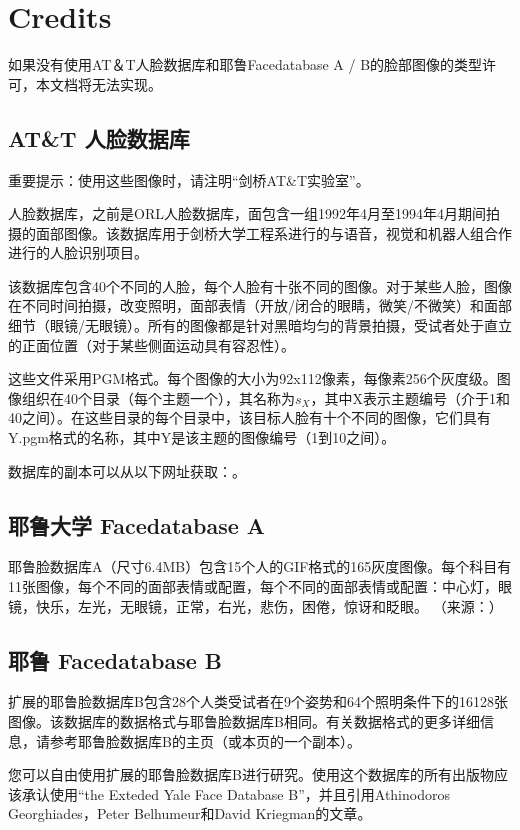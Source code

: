 \documentclass[UTF8]{ctexart}
\begin{document}
\section{Credits}
如果没有使用AT＆T人脸数据库和耶鲁Facedatabase A / B的脸部图像的类型许可，本文档将无法实现。

\subsection{AT\&T 人脸数据库}
重要提示：使用这些图像时，请注明“剑桥AT\&T实验室”。

人脸数据库，之前是ORL人脸数据库，面包含一组1992年4月至1994年4月期间拍摄的面部图像。该数据库用于剑桥大学工程系进行的与语音，视觉和机器人组合作进行的人脸识别项目。

该数据库包含40个不同的人脸，每个人脸有十张不同的图像。对于某些人脸，图像在不同时间拍摄，改变照明，面部表情（开放/闭合的眼睛，微笑/不微笑）和面部细节（眼镜/无眼镜）。所有的图像都是针对黑暗均匀的背景拍摄，受试者处于直立的正面位置（对于某些侧面运动具有容忍性）。

这些文件采用PGM格式。每个图像的大小为92x112像素，每像素256个灰度级。图像组织在40个目录（每个主题一个），其名称为$s_X$，其中X表示主题编号（介于1和40之间）。在这些目录的每个目录中，该目标人脸有十个不同的图像，它们具有Y.pgm格式的名称，其中Y是该主题的图像编号（1到10之间）。

数据库的副本可以从以下网址获取：{\color{blue}{http://www.cl.cam.ac.uk/research/dtg/attarchive/pub/data/att\_faces.zip}}。

\subsection{耶鲁大学 Facedatabase A}
耶鲁脸数据库A（尺寸6.4MB）包含15个人的GIF格式的165灰度图像。每个科目有11张图像，每个不同的面部表情或配置，每个不同的面部表情或配置：中心灯，眼镜，快乐，左光，无眼镜，正常，右光，悲伤，困倦，惊讶和眨眼。 （来源：{\color{blue}{http://cvc.yale.edu/projects/yalefaces/yalefaces.html}}）

\subsection{耶鲁 Facedatabase B}
扩展的耶鲁脸数据库B包含28个人类受试者在9个姿势和64个照明条件下的16128张图像。该数据库的数据格式与耶鲁脸数据库B相同。有关数据格式的更多详细信息，请参考耶鲁脸数据库B的主页（或本页的一个副本）。

您可以自由使用扩展的耶鲁脸数据库B进行研究。使用这个数据库的所有出版物应该承认使用“the Exteded Yale Face Database B”，并且引用Athinodoros Georghiades，Peter Belhumeur和David Kriegman的文章\cite{Georghiades2001}。
\end{document}
